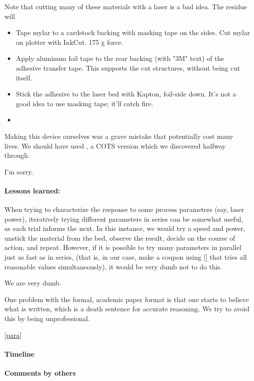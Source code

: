 \documentclass[paper.tex]{subfiles}
\begin{document}
Note that cutting many of these materials with a laser is a bad idea. The residue will 

\begin{itemize}
	\item Tape mylar to a cardstock backing with masking tape on the sides. Cut mylar on plotter with InkCut. 175 g force. 
	\item Apply aluminum foil tape to the rear backing (with "3M" text) of the adhesive transfer tape. This supports the cut structures, without being cut itself.
	\item Stick the adhesive to the laser bed with Kapton, foil-side down. It's not a good idea to use masking tape; it'll catch fire.
	\item 
\end{itemize}





Making this device ourselves was a grave mistake that potentially cost many lives. We should have used \cite{Straight}, a COTS version which we discovered halfway through. 

I'm sorry.

\paragraph{Lessons learned:}

When trying to characterize the response to some process parameters (say, laser power), iteratively trying different parameters in series can be somewhat useful, as each trial informs the next. In this instance, we would try a speed and power, unstick the material from the bed, observe the result, decide on the course of action, and repeat. However, if it is possible to try many parameters in parallel just as fast as in series, (that is, in our case, make a coupon using [] that tries all reasonable values simultaneously), it would be very dumb not to do this.

We are very dumb.

\printbibliography[title={General fluidics resources}, keyword={microfluidics}]

\printbibliography[title={Centrifugal}, keyword={centrifugal}]



One problem with the formal, academic paper format is that one starts to believe what is written, which is a death sentence for accurate reasoning. We try to avoid this by being unprofessional.

\label{para}
\ref{para}

\paragraph{Timeline}

\paragraph{Comments by others}



\end{document}
